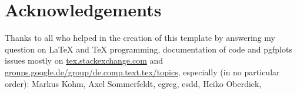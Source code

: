 \section*{Acknowledgements}
Thanks to all who helped in the creation of this template by answering my question on LaTeX and TeX programming, documentation of code and pgfplots issues mostly on \href{http://tex.stackexchange.com}{tex.stackexchange.com} and
\href{de.comp.text.tex}{groups.google.de/group/de.comp.text.tex/topics}, especially (in no particular order): 
Markus Kohm, %
Axel Sommerfeldt, %
egreg, %
esdd,
Heiko Oberdiek, %
